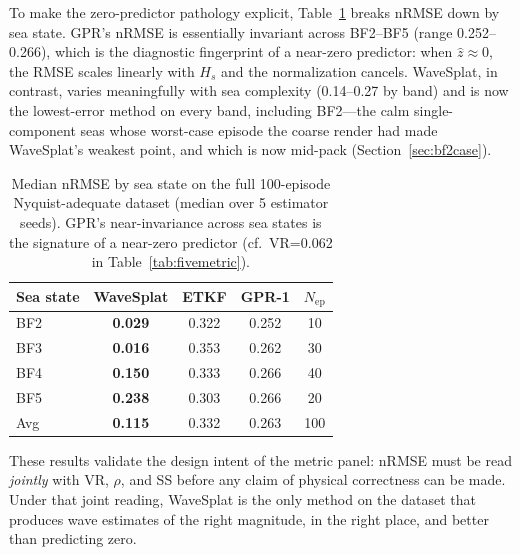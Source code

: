 To make the zero-predictor pathology explicit, Table~\ref{tab:bybf}
breaks nRMSE down by sea state.  GPR's nRMSE is essentially invariant
across BF2--BF5 (range 0.252--0.266), which is the diagnostic
fingerprint of a near-zero predictor: when $\hat{z}\!\approx\!0$, the
RMSE scales linearly with $H_s$ and the normalization cancels.
WaveSplat, in contrast, varies meaningfully with sea complexity
(0.14--0.27 by band) and is now the lowest-error method on every band,
including BF2---the calm single-component seas whose worst-case episode
the coarse render had made WaveSplat's weakest point, and which is now
mid-pack (Section~\ref{sec:bf2case}).

\begin{table}[t]
\centering
\caption{Median nRMSE by sea state on the full 100-episode
Nyquist-adequate dataset (median over 5 estimator seeds).
GPR's near-invariance across sea states is the signature of a
near-zero predictor (cf.\ VR=0.062 in Table~\ref{tab:fivemetric}).}
\label{tab:bybf}
\begin{tabular}{lcccc}
\toprule
Sea state & WaveSplat & ETKF & GPR-1 & $N_{\text{ep}}$ \\
\midrule
BF2 & \textbf{0.029} & 0.322 & 0.252 & 10 \\
BF3 & \textbf{0.016} & 0.353 & 0.262 & 30 \\
BF4 & \textbf{0.150} & 0.333 & 0.266 & 40 \\
BF5 & \textbf{0.238} & 0.303 & 0.266 & 20 \\
\midrule
Avg & \textbf{0.115} & 0.332 & 0.263 & 100 \\
\bottomrule
\end{tabular}
\end{table}

These results validate the design intent of the metric panel: nRMSE
must be read \emph{jointly} with VR, $\rho$, and SS before any claim
of physical correctness can be made.  Under that joint reading,
WaveSplat is the only method on the dataset that produces wave
estimates of the right magnitude, in the right place, and better than
predicting zero.

